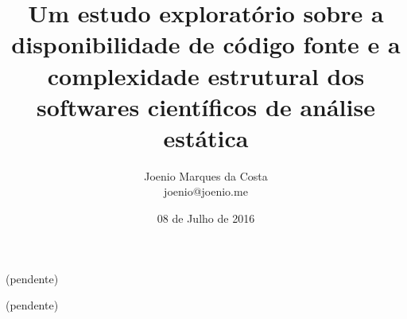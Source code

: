 \documentclass[msc, classic, a4paper]{ufbathesis}
\date{08 de Julho de 2016}
\title{
  Um estudo exploratório sobre a disponibilidade de código fonte e a
  complexidade estrutural dos softwares científicos de análise estática
}
\author{Joenio Marques da Costa\\
  {\small joenio@joenio.me}
}
\begin{document}
\frontpage
\frontmatter
\presentationpage

\resumo

(pendente)

\begin{keywords}

  (pendente)

\end{keywords}

\tableofcontents
\listoffigures
\listoftables

\mainmatter










\backmatter


\appendix


\end{document}
